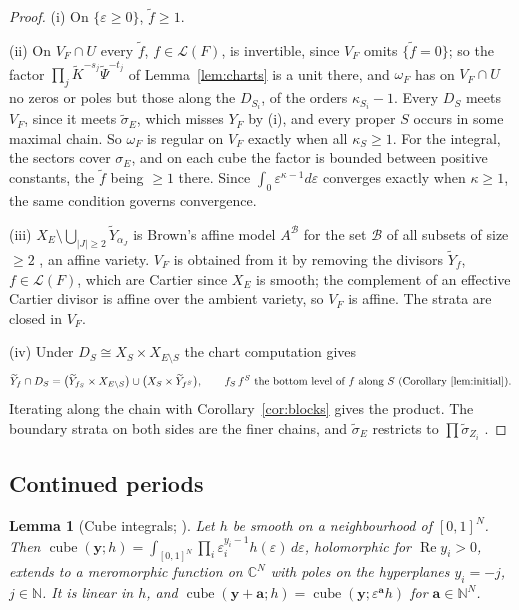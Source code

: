 \documentclass[11pt]{article}
\theoremstyle{plain}
\newtheorem{lemma}[prop]{Lemma}
\theoremstyle{definition}
\theoremstyle{remark}
\newcommand{\cL}{\mathcal L}
\newcommand{\cB}{\mathcal B}
\newcommand{\N}{\mathbb N}
\newcommand{\tsig}{\widetilde\sigma}
\DeclareMathOperator{\re}{Re}
\begin{document}
\begin{proof}
(i) On $\{\varepsilon\ge0\}$, $\widetilde f\ge1$.

(ii) On $V_F\cap U$ every $\widetilde f$, $f\in\cL(F)$, is invertible, since $V_F$ omits $\{\widetilde f=0\}$; so the factor $\prod_j\widetilde K^{-s_j}\widetilde\Psi^{-t_j}$ of Lemma~\ref{lem:charts} is a unit there, and $\omega_F$ has on $V_F\cap U$ no zeros or poles but those along the $D_{S_i}$, of the orders $\kappa_{S_i}-1$. Every $D_S$ meets $V_F$, since it meets $\tsig_E$, which misses $Y_F$ by (i), and every proper $S$ occurs in some maximal chain. So $\omega_F$ is regular on $V_F$ exactly when all $\kappa_S\ge1$. For the integral, the sectors cover $\sigma_E$, and on each cube the factor is bounded between positive constants, the $\widetilde f$ being $\ge1$ there. Since $\int_0\varepsilon^{\kappa-1}d\varepsilon$ converges exactly when $\kappa\ge1$, the same condition governs convergence.

(iii) $X_E\setminus\bigcup_{|J|\ge2}\widetilde Y_{\alpha_J}$ is Brown's affine model $A^{\cB}$ for the set $\cB$ of all subsets of size $\ge2$ \cite[Def.~5.6, Thm.~5.7]{B2}, an affine variety. $V_F$ is obtained from it by removing the divisors $\widetilde Y_f$, $f\in\cL(F)$, which are Cartier since $X_E$ is smooth; the complement of an effective Cartier divisor is affine over the ambient variety, so $V_F$ is affine. The strata are closed in $V_F$.

(iv) Under $D_{S}\cong X_S\times X_{E\setminus S}$ \cite[Thm.~5.1]{B2} the chart computation gives
\[
\widetilde Y_f\cap D_S=\big(\widetilde Y_{f_S}\times X_{E\setminus S}\big)\cup\big(X_S\times\widetilde Y_{f^S}\big),\qquad f_S\,f^S\ \text{the bottom level of $f$ along $S$ (Corollary~\ref{lem:initial})}.
\]
Iterating along the chain with Corollary~\ref{cor:blocks} gives the product. The boundary strata on both sides are the finer chains, and $\tsig_E$ restricts to $\prod\tsig_{Z_i}$ \cite[Cor.~5.2]{B2}.
\end{proof}

\subsection{Continued periods}

\begin{lemma}[Cube integrals; {\cite[Lemma~8.6, p.~55]{F}}]\label{lem:cube}
Let $h$ be smooth on a neighbourhood of $[0,1]^N$. Then $\operatorname{cube}(\mathbf y;h)=\int_{[0,1]^N}\prod_i\varepsilon_i^{y_i-1}h(\varepsilon)\,d\varepsilon$, holomorphic for $\re y_i>0$, extends to a meromorphic function on $\mathbb C^N$ with poles on the hyperplanes $y_i=-j$, $j\in\N$. It is linear in $h$, and $\operatorname{cube}(\mathbf y+\mathbf a;h)=\operatorname{cube}(\mathbf y;\varepsilon^{\mathbf a}h)$ for $\mathbf a\in\N^N$.
\end{lemma}
\end{document}
